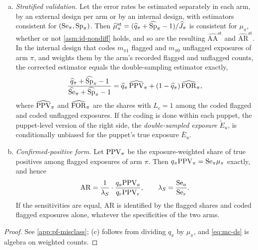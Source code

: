 \begin{theorem}
\begin{enumerate}[(a)]
  \item \emph{Stratified validation.} Let the error rates be estimated separately in each arm, by an external design per arm or by an internal design, with estimators consistent for $(\mathrm{Se}_\pi,\mathrm{Sp}_\pi)$. Then $\widehat\mu^{\mathrm{st}}_\pi=(\widehat q_\pi+\widehat{\mathrm{Sp}}_\pi-1)/\widehat J_\pi$ is consistent for $\mu_\pi$, whether or not \cref{asm:id-nondiff} holds, and so are the resulting $\widehat{\mathrm{AA}}^{\mathrm{st}}$ and $\widehat{\mathrm{AR}}^{\mathrm{st}}$. In the internal design that codes $m_{\pi1}$ flagged and $m_{\pi0}$ unflagged exposures of arm $\pi$, and weights them by the arm's recorded flagged and unflagged counts, the corrected estimator equals the double-sampling estimator exactly,
  \begin{equation}\label{eq:mc-ds}
    \frac{\widehat q_\pi+\widehat{\mathrm{Sp}}_\pi-1}{\widehat{\mathrm{Se}}_\pi+\widehat{\mathrm{Sp}}_\pi-1}=\widehat q_\pi\,\widehat{\mathrm{PPV}}_\pi+(1-\widehat q_\pi)\,\widehat{\mathrm{FOR}}_\pi,
  \end{equation}
  where $\widehat{\mathrm{PPV}}_\pi$ and $\widehat{\mathrm{FOR}}_\pi$ are the shares with $L_c=1$ among the coded flagged and coded unflagged exposures. If the coding is done within each puppet, the puppet-level version of the right side, the \emph{double-sampled exposure} $\widetilde E_u$, is conditionally unbiased for the puppet's true exposure $\bar E_u$.
  \item \emph{Confirmed-positive form.} Let $\mathrm{PPV}_\pi$ be the exposure-weighted share of true positives among flagged exposures of arm $\pi$. Then $q_\pi\mathrm{PPV}_\pi=\mathrm{Se}_\pi\mu_\pi$ exactly, and hence
  \begin{equation}\label{eq:mc-confirmed}
    \mathrm{AR}=\frac{1}{\lambda_S}\cdot\frac{q_a\mathrm{PPV}_a}{q_r\mathrm{PPV}_r},\qquad \lambda_S=\frac{\mathrm{Se}_a}{\mathrm{Se}_r}.
  \end{equation}
  If the sensitivities are equal, $\mathrm{AR}$ is identified by the flagged shares and coded flagged exposures alone, whatever the specificities of the two arms.
\end{enumerate}
\end{theorem}

\begin{proof}See \cref{app:pf-misclass}; (c) follows from dividing $q_\pi$ by $\mu_\pi$, and \eqref{eq:mc-ds} is algebra on weighted counts.\end{proof}

